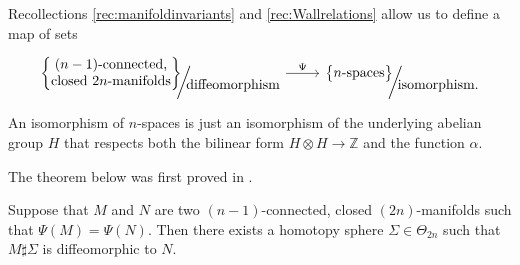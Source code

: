 \begin{dfn}
Recollections \ref{rec:manifoldinvariants} and \ref{rec:Wallrelations} allow us to define a map of sets
$$
\begin{tikzcd}
\left\{ \begin{matrix} (n-1)\text{-connected,} \\ \text{closed }2n\text{-manifolds} \end{matrix} \right\}\hspace{-1.2ex}\raisebox{-1.5ex}{\bigg/}
\hspace{-.8ex}\raisebox{-2ex}{\text{diffeomorphism}}
\arrow{r}{\Psi} &  
\left\{\begin{matrix} n\text{-spaces} \\ \end{matrix} \right\}\hspace{-1.2ex}\raisebox{-1.5ex}{\bigg/}
\hspace{-.8ex}\raisebox{-2ex}{\text{isomorphism.}}
\end{tikzcd}
$$
%
An isomorphism of $n$-spaces is just an isomorphism of the underlying abelian group $H$ that respects both the bilinear form $H \otimes H \to \mathbb{Z}$ and the function $\alpha$.
\end{dfn}

The theorem below was first proved in \cite[p.170]{Wall62}.

\begin{thm}[Wall]
Suppose that $M$ and $N$ are two $(n-1)$-connected, closed $(2n)$-manifolds such that $\Psi(M)=\Psi(N)$.  Then there exists a homotopy sphere $\Sigma \in \Theta_{2n}$ such that $M \sharp \Sigma$ is diffeomorphic to $N$.
\end{thm}

